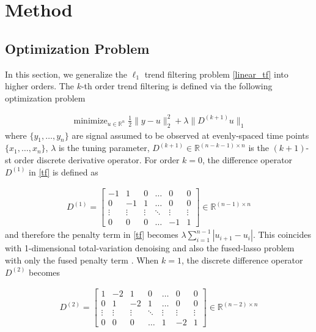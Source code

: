 \documentclass[a4paper]{article}
\newcommand{\RR}{\mathbb{R}}
\DeclareMathOperator*{\minimize}{minimize}
\begin{document}
\section{Method}
\label{sec:method}

\subsection{Optimization Problem}
\label{subsec:opt_problem}
In this section, we generalize the $\ell_1$ trend filtering problem \eqref{linear_tf} into higher orders. The $k$-th order trend filtering is defined via the following optimization problem

\begin{align}
\minimize_{u\in\RR^n} \frac{1}{2}\|y-u\|_2^2 + \lambda\|D^{(k+1)}u\|_1  \label{tf}
\end{align}
where $\{y_1,\ldots, y_n\}$ are signal assumed to be observed at evenly-spaced time points $\{x_1,\ldots,x_n\}$, $\lambda$ is the tuning parameter, $D^{(k+1)}\in\RR^{(n-k-1)\times n}$ is the $(k+1)$-st order discrete derivative operator. For order $k = 0$, the difference operator $D^{(1)}$ in \eqref{tf} is defined as

\begin{align}
D^{(1)} =
\begin{bmatrix}
-1 & 1 & 0 & \ldots & 0 & 0\\
0 & -1 & 1 & \ldots & 0 & 0\\
\vdots & \vdots & \vdots & \ddots & \vdots & \vdots\\
0 & 0 & 0 & \ldots & -1 & 1
\end{bmatrix}\in\RR^{(n-1) \times n}
\end{align}
and therefore the penalty term in \eqref{tf} becomes $\lambda\sum_{i=1}^{n-1}|u_{i+1}- u_i|$. This coincides with 1-dimensional total-variation denoising \cite{rudin1992nonlinear,harchaoui2010multiple} and also the fused-lasso problem with only the fused penalty term \cite{tibshirani2005sparsity}. When $k = 1$, the discrete difference operator $D^{(2)}$ becomes


\begin{align}
D^{(2)} =
\begin{bmatrix}
1 & -2 & 1 & 0 & \ldots & 0 & 0\\
0 & 1 & -2 & 1 & \ldots & 0 & 0\\
\vdots & \vdots & \vdots & \ddots & \vdots & \vdots & \vdots\\
0 & 0 & 0 & \ldots & 1 & -2 & 1
\end{bmatrix}\in\RR^{(n-2) \times n}
\end{align}
\end{document}
